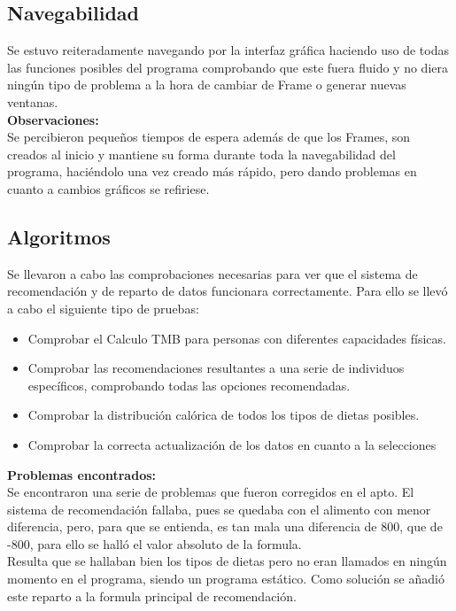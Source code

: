 \subsection{Navegabilidad}
Se estuvo reiteradamente navegando por la interfaz gráfica haciendo uso de todas las funciones posibles del programa comprobando que este fuera fluido y no diera ningún tipo de problema a la hora de cambiar de Frame o generar nuevas ventanas.\\
\textbf{Observaciones:}\\
Se percibieron pequeños tiempos de espera además de que los Frames, son creados al inicio y mantiene su forma durante toda la navegabilidad del programa, haciéndolo una vez creado más rápido, pero dando problemas en cuanto a cambios gráficos se refiriese.
\subsection{Algoritmos}
Se llevaron a cabo las comprobaciones necesarias para ver que el sistema de recomendación y de reparto de datos funcionara correctamente. Para ello se llevó a cabo el siguiente tipo de pruebas:
\begin{itemize}
\item Comprobar el Calculo TMB para personas con diferentes capacidades físicas.
\item Comprobar las recomendaciones resultantes a una serie de individuos específicos, comprobando todas las opciones recomendadas.
\item Comprobar la distribución calórica de todos los tipos de dietas posibles.
\item Comprobar la correcta actualización de los datos en cuanto a la selecciones
\end{itemize}
\textbf{Problemas encontrados:}\\
Se encontraron una serie de problemas que fueron corregidos en el apto. El sistema de recomendación fallaba, pues se quedaba con el alimento con menor diferencia, pero, para que se entienda, es tan mala una diferencia de 800, que de -800, para ello se halló el valor absoluto de la formula.\\
Resulta que se hallaban bien los tipos de dietas pero no eran llamados en ningún momento en el programa, siendo un programa estático. Como solución se añadió este reparto a la formula principal de recomendación.